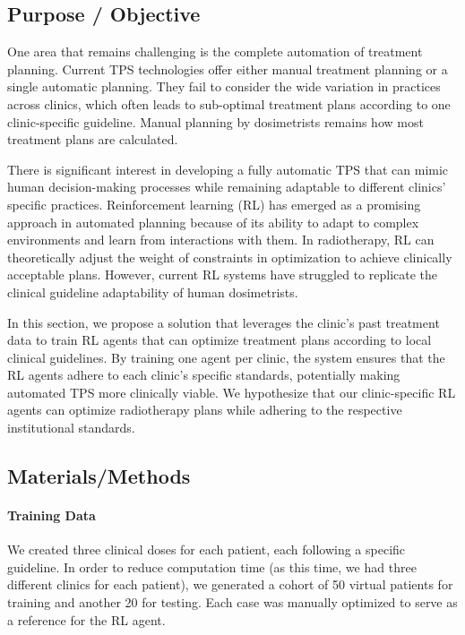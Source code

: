 \subsection{Purpose / Objective}
One area that remains challenging is the complete automation of treatment planning.
Current TPS technologies offer either manual treatment planning or a single automatic planning.
They fail to consider the wide variation in practices across clinics, which often leads to sub-optimal treatment plans according to one clinic-specific guideline.
Manual planning by dosimetrists remains how most treatment plans are calculated.

There is significant interest in developing a fully automatic TPS that can mimic human decision-making processes while remaining adaptable to different clinics' specific practices.
Reinforcement learning (RL) has emerged as a promising approach in automated planning because of its ability to adapt to complex environments and learn from interactions with them.
In radiotherapy, RL can theoretically adjust the weight of constraints in optimization to achieve clinically acceptable plans.
However, current RL systems have struggled to replicate the clinical guideline adaptability of human dosimetrists.

In this section, we propose a solution that leverages the clinic's past treatment data to train RL agents that can optimize treatment plans according to local clinical guidelines.
By training one agent per clinic, the system ensures that the RL agents adhere to each clinic's specific standards, potentially making automated TPS more clinically viable.
We hypothesize that our clinic-specific RL agents can optimize radiotherapy plans while adhering to the respective institutional standards.

\subsection{Materials/Methods}

\paragraph{Training Data}
We created three clinical doses for each patient, each following a specific guideline.
In order to reduce computation time (as this time, we had three different clinics for each patient), we generated a cohort of 50 virtual patients for training and another 20 for testing.
Each case was manually optimized to serve as a reference for the RL agent.

